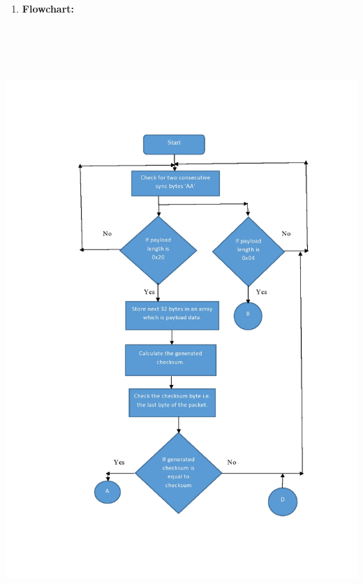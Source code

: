 \documentclass[12pt]{article}
\begin{document}
\begin{enumerate}
\begin{enumerate}
	\item \textbf{Flowchart:}
\end{enumerate}
\begin{center}
	\graphicspath{ {images/} }
	\includegraphics[width=18cm, height=23cm]{Flowchart1}
\end{center}
\begin{center}
	\graphicspath{ {images/} }

\end{center}
\end{enumerate}
\end{document}
